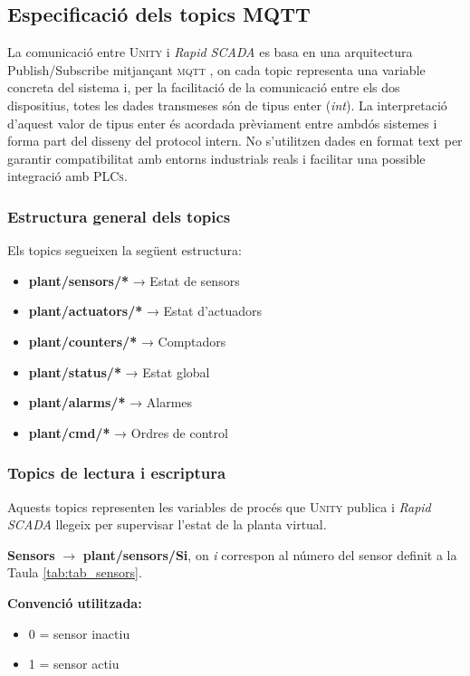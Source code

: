 \documentclass[a4paper,11pt,DIV=13,headings=normal,abstract=true,twoside=semi]{article}
\newcommand{\acro}[1]{\textsc{#1}}
\begin{document}
\subsection{Especificació dels topics MQTT}

La comunicació entre \acro{Unity} i \emph{Rapid SCADA} es basa en una arquitectura Publish/Subscribe mitjançant \acro{mqtt} \cite{Team2015MQTT}, on cada topic representa una variable concreta del sistema i, per la facilitació de la comunicació entre els dos dispositius, totes les dades transmeses són de tipus enter (\emph{int}). La interpretació d'aquest valor de tipus enter és acordada prèviament entre ambdós sistemes i forma part del disseny del protocol intern. No s'utilitzen dades en format text per garantir compatibilitat amb entorns industrials reals i facilitar una possible integració amb \acro{PLCs}.
\subsubsection{Estructura general dels topics}

Els topics segueixen la següent estructura:

\begin{itemize}
    \item \textbf{plant/sensors/*} → Estat de sensors
    \item \textbf{plant/actuators/*} → Estat d'actuadors
    \item \textbf{plant/counters/*} → Comptadors
    \item \textbf{plant/status/*} → Estat global
    \item \textbf{plant/alarms/*} → Alarmes
    \item \textbf{plant/cmd/*} → Ordres de control
\end{itemize}

\subsubsection{Topics de lectura i escriptura}

Aquests topics representen les variables de procés que \acro{Unity} publica i \emph{Rapid SCADA} llegeix per supervisar l'estat de la planta virtual.

\textbf{Sensors} $\rightarrow$ \textbf{plant/sensors/Si},  on \emph{i} correspon al número del sensor definit a la Taula \ref{tab:tab_sensors}.

\textbf{Convenció utilitzada:}

\begin{itemize}
\item 0 = sensor inactiu
\item 1 = sensor actiu
\end{itemize}
\end{document}
